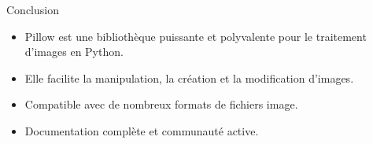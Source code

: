 \begin{frame}{Conclusion}
    \begin{itemize}
        \item Pillow est une bibliothèque puissante et polyvalente pour le traitement
              d'images en Python.
        \item Elle facilite la manipulation, la création et la modification d'images.
        \item Compatible avec de nombreux formats de fichiers image.
        \item Documentation complète et communauté active.
    \end{itemize}
\end{frame}